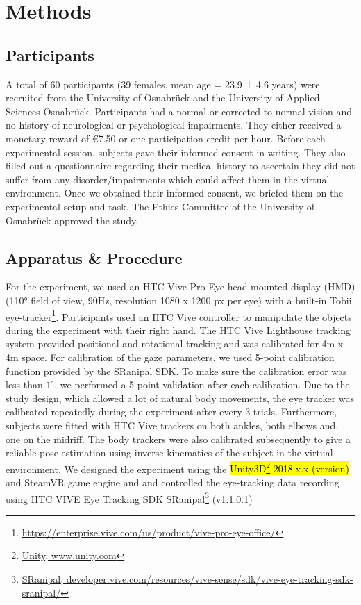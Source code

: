 \section{Methods}
\subsection{Participants}
A total of 60 participants (39 females, mean age = 23.9 ± 4.6 years) were recruited from the University of Osnabr{\"u}ck and the University of Applied Sciences Osnabr{\"u}ck. Participants had a normal or corrected-to-normal vision and no history of neurological or psychological impairments. They either received a monetary reward of €7.50 or one participation credit per hour. Before each experimental session, subjects gave their informed consent in writing. They also filled out a questionnaire regarding their medical history to ascertain they did not suffer from any disorder/impairments which could affect them in the virtual environment. Once we obtained their informed consent, we briefed them on the experimental setup and task. The Ethics Committee of the University of Osnabr{\"u}ck approved the study. 

\subsection{Apparatus \& Procedure}
For the experiment, we used an HTC Vive Pro Eye head-mounted display (HMD)(110° field of view, 90Hz, resolution 1080 x 1200 px per eye) with a built-in Tobii eye-tracker\footnote{\href{https://enterprise.vive.com/us/product/vive-pro-eye/}{https://enterprise.vive.com/us/product/vive-pro-eye-office/}}. Participants used an HTC Vive controller to manipulate the objects during the experiment with their right hand. The HTC Vive Lighthouse tracking system provided positional and rotational tracking and was calibrated for 4m x 4m space. For calibration of the gaze parameters, we used 5-point calibration function provided by the SRanipal SDK. To make sure the calibration error was less than $1^\circ$, we performed a 5-point validation after each calibration. Due to the study design, which allowed a lot of natural body movements, the eye tracker was calibrated repeatedly during the experiment after every 3 trials. Furthermore, subjects were fitted with HTC Vive trackers on both ankles, both elbows and, one on the midriff. The body trackers were also calibrated subsequently to give a reliable pose estimation using inverse kinematics of the subject in the virtual environment. We designed the experiment using the \hl{Unity3D\footnote{\href{www.unity.com}{Unity, www.unity.com}}  2018.x.x (version)} and SteamVR game engine and and controlled the eye-tracking data recording using HTC VIVE Eye Tracking SDK SRanipal\footnote{\href{https://developer.vive.com/resources/vive-sense/sdk/vive-eye-tracking-sdk-sranipal/}{SRanipal, developer.vive.com/resources/vive-sense/sdk/vive-eye-tracking-sdk-sranipal/}} (v1.1.0.1)

